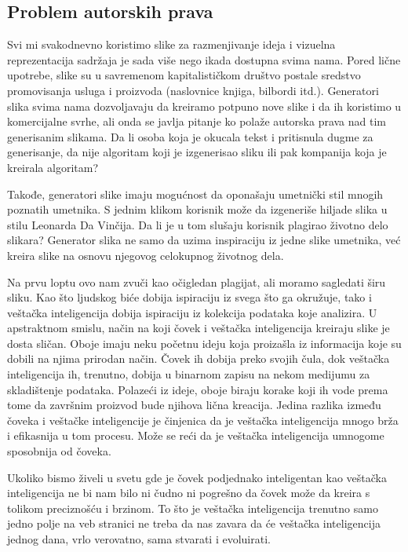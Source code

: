 \documentclass[12pt, letterpaper]{article}
\begin{document}
\subsection{Problem autorskih prava}

Svi mi svakodnevno koristimo slike za razmenjivanje ideja i vizuelna reprezentacija sadržaja je sada više nego ikada dostupna svima nama. Pored lične upotrebe, slike su u savremenom kapitalističkom društvo postale sredstvo promovisanja usluga i proizvoda (naslovnice knjiga, bilbordi itd.). Generatori slika svima nama dozvoljavaju da kreiramo potpuno nove slike i da ih koristimo u komercijalne svrhe, ali onda se javlja pitanje ko polaže autorska prava nad tim generisanim slikama. Da li osoba koja je okucala tekst i pritisnula dugme za generisanje, da nije algoritam koji je izgenerisao sliku ili pak kompanija koja je kreirala algoritam?

Takođe, generatori slike imaju mogućnost da oponašaju umetnički stil mnogih poznatih umetnika. S jednim klikom korisnik može da izgeneriše hiljade slika u stilu Leonarda Da Vinčija. Da li je u tom slušaju korisnik plagirao životno delo slikara? Generator slika ne samo da uzima inspiraciju iz jedne slike umetnika, već kreira slike na osnovu njegovog celokupnog životnog dela.

Na prvu loptu ovo nam zvuči kao očigledan plagijat, ali moramo sagledati širu sliku. Kao što ljudskog biće dobija ispiraciju iz svega što ga okružuje, tako i veštačka inteligencija dobija ispiraciju iz kolekcija podataka koje analizira. U apstraktnom smislu, način na koji čovek i veštačka inteligencija kreiraju slike je dosta sličan. Oboje imaju neku početnu ideju koja proizašla iz informacija koje su dobili na njima prirodan način. Čovek ih dobija preko svojih čula, dok veštačka inteligencija ih, trenutno, dobija u binarnom zapisu na nekom medijumu za skladištenje podataka. Polazeći iz ideje, oboje biraju korake koji ih vode prema tome da završnim proizvod bude njihova lična kreacija. Jedina razlika između čoveka i veštačke inteligencije je činjenica da je veštačka inteligencija mnogo brža i efikasnija u tom procesu. Može se reći da je veštačka inteligencija umnogome sposobnija od čoveka. 

Ukoliko bismo živeli u svetu gde je čovek podjednako inteligentan kao veštačka inteligencija ne bi nam bilo ni čudno ni pogrešno da čovek može da kreira s tolikom preciznošću i brzinom. To što je veštačka inteligencija trenutno samo jedno polje na veb stranici ne treba da nas zavara da će veštačka inteligencija jednog dana, vrlo verovatno, sama stvarati i evoluirati.
\end{document}

